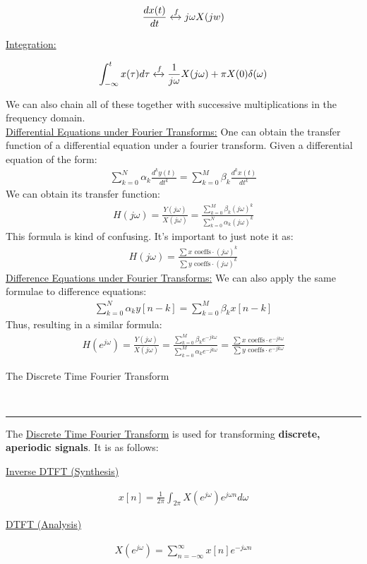 \documentclass{article}
\newcommand{\sheader}[1]{\underline{#1:}}
\newcommand{\ftrans}{\xleftrightarrow[]{f}}
\newcommand{\header}[1]{\begin{large}\noindent #1\end{large}\\\rule{\textwidth}{0.5pt}}
\newcommand{\gap}{\medskip\\}
\newcommand{\centertext}[1]{\begin{center}#1\end{center}}
\newcommand{\jomega}{{j\omega}}
\begin{document}
\begin{align*}
    \frac{dx(t)}{dt} \ftrans \jomega X(jw)
\end{align*}

\sheader{Integration}

\begin{align*}
    \int_{-\infty}^t x(\tau) d\tau \ftrans \frac{1}{\jomega}X(\jomega) + \pi X(0)\delta(\omega)
\end{align*}

We can also chain all of these together with successive multiplications
in the frequency domain.
\gap
\sheader{Differential Equations under Fourier Transforms} One can obtain
the transfer function of a differential equation under a fourier transform.
Given a differential equation of the form:
\begin{align*}
    \sum_{k = 0}^N \alpha_k \frac{d^ky(t)}{dt^k} = \sum_{k = 0}^M \beta_k \frac{d^k x(t)}{dt^k}
\end{align*}
We can obtain its transfer function:
\begin{align*}
    H(j\omega) = \frac{Y(\jomega)}{X(\jomega)} = \frac{\sum_{k = 0}^M \beta_k (\jomega)^k}{\sum_{k = 0}^N\alpha_k(\jomega)^k}
\end{align*}
This formula is kind of confusing. It's important to just note it as:
\begin{align*}
    H(\jomega) = \frac{\sum x\textrm{ coeffs}\cdot (\jomega)^k}{\sum y \textrm{ coeffs} \cdot (\jomega)^k}
\end{align*}
\sheader{Difference Equations under Fourier Transforms} 
We can also apply the same formulae to difference equations:
\begin{align*}
    \sum_{k = 0}^N \alpha_k y[n - k] = \sum_{k = 0}^M \beta_k x[n - k]
\end{align*}
Thus, resulting in a similar formula:
\begin{align*}
    H(e^\jomega) = \frac{Y(\jomega)}{X(\jomega)} = \frac{\sum_{k = 0}^M \beta_k e^{-jk\omega}}{\sum_{k = 0}^M \alpha_k e^{-jk\omega}} = \frac{\sum x \textrm{ coeffs} \cdot e^{-jk\omega}}{\sum y \textrm{ coeffs} \cdot e^{-jk\omega}}
\end{align*}

\pagebreak

\header{The Discrete Time Fourier Transform}

The \underline{Discrete Time Fourier Transform} is used for transforming
\textbf{discrete, aperiodic signals}. It is as follows:
\begin{multicols}{2}
    \centertext{\underline{Inverse DTFT (Synthesis)}}
    \begin{align*}
        x[n] = \frac{1}{2\pi}\int_{2\pi}X(e^\jomega)e^{\jomega n}d\omega
    \end{align*}
    \vfill\null\columnbreak
    \centertext{\underline{DTFT (Analysis)}}
    \begin{align*}
        X(e^\jomega) = \sum_{n = -\infty}^\infty x[n] e^{-j\omega n}
    \end{align*}
    \vfill\null
    
\end{multicols}
\end{document}
